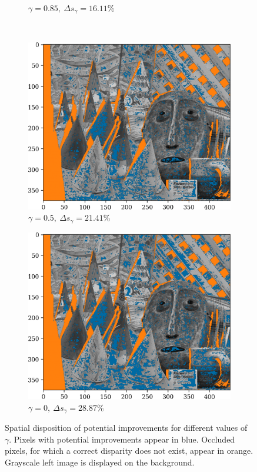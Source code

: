 \begin{figure}[ht]
\begin{subfigure}{0.48\linewidth}
        \caption{$\gamma=0.85,~\Delta s_\gamma=16.11\%$}
        \label{fig:improvements_b}
    \end{subfigure}\\
    \begin{subfigure}{0.48\linewidth}
        \centering
        \includegraphics[width=\linewidth]{Images/Improvements_Pl=0.5.png}
        \caption{$\gamma=0.5,~\Delta s_\gamma=21.41\%$}
        \label{fig:improvements_c}
    \end{subfigure}
    \begin{subfigure}{0.48\linewidth}
        \centering
        \includegraphics[width=\linewidth]{Images/Improvements_Pl=0.0.png}
        \caption{$\gamma=0,~\Delta s_\gamma=28.87\%$}
        \label{fig:improvements_d}
    \end{subfigure}
    \caption{Spatial disposition of potential improvements for different values of $\gamma$. Pixels with potential improvements appear in blue. Occluded pixels, for which a correct disparity does not exist, appear in orange. Grayscale left image is displayed on the background.}
    \label{fig:improvements}
\end{figure}

